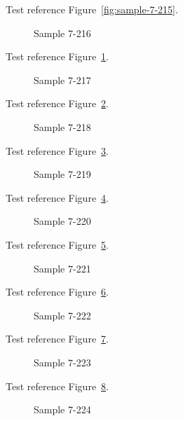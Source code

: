 Test reference Figure~\ref{fig:sample-7-215}.

\begin{figure}[tbhp]
\caption{Sample 7-216}
\label{fig:sample-7-216}
\end{figure}

Test reference Figure~\ref{fig:sample-7-216}.

\begin{figure}[tbhp]
\caption{Sample 7-217}
\label{fig:sample-7-217}
\end{figure}

Test reference Figure~\ref{fig:sample-7-217}.

\begin{figure}[tbhp]
\caption{Sample 7-218}
\label{fig:sample-7-218}
\end{figure}

Test reference Figure~\ref{fig:sample-7-218}.

\begin{figure}[tbhp]
\caption{Sample 7-219}
\label{fig:sample-7-219}
\end{figure}

Test reference Figure~\ref{fig:sample-7-219}.

\begin{figure}[tbhp]
\caption{Sample 7-220}
\label{fig:sample-7-220}
\end{figure}

Test reference Figure~\ref{fig:sample-7-220}.

\begin{figure}[tbhp]
\caption{Sample 7-221}
\label{fig:sample-7-221}
\end{figure}

Test reference Figure~\ref{fig:sample-7-221}.

\begin{figure}[tbhp]
\caption{Sample 7-222}
\label{fig:sample-7-222}
\end{figure}

Test reference Figure~\ref{fig:sample-7-222}.

\begin{figure}[tbhp]
\caption{Sample 7-223}
\label{fig:sample-7-223}
\end{figure}

Test reference Figure~\ref{fig:sample-7-223}.

\begin{figure}[tbhp]
\caption{Sample 7-224}
\label{fig:sample-7-224}
\end{figure}

